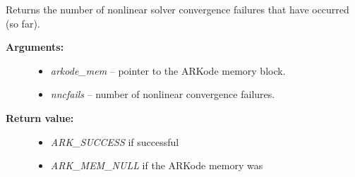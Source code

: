 \documentclass[letterpaper,10pt,english]{sphinxmanual}
\begin{document}
\begin{fulllineitems}
\label{c_interface/User_callable:ARKodeGetNumNonlinSolvConvFails}
Returns the number of nonlinear solver convergence
failures that have occurred (so far).
\begin{description}
\item[{\textbf{Arguments:}}] \leavevmode\begin{itemize}
\item {} 
\emph{arkode\_mem} -- pointer to the ARKode memory block.

\item {} 
\emph{nncfails} -- number of nonlinear convergence failures.

\end{itemize}

\item[{\textbf{Return value:}}] \leavevmode\begin{itemize}
\item {} 
\emph{ARK\_SUCCESS} if successful

\item {} 
\emph{ARK\_MEM\_NULL} if the ARKode memory was 

\end{itemize}

\end{description}

\end{fulllineitems}

\end{document}
